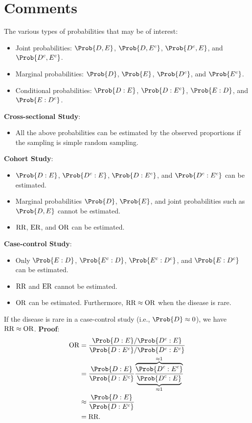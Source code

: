 \section{Comments}
The various types of probabilities that may be of interest:
\begin{itemize}
    \item Joint probabilities: $ \Prob{D,E} $, $ \Prob{D,E^c} $, $ \Prob{D^c,E} $, and $ \Prob{D^c,E^c} $.
    \item Marginal probabilities: $ \Prob{D} $, $ \Prob{E} $, $ \Prob{D^c} $, and $ \Prob{E^c} $.
    \item Conditional probabilities: $ \Prob{D\given E} $, $ \Prob{D\given E^c} $, $ \Prob{E\given D} $, and $ \Prob{E\given D^c} $.
\end{itemize}
\textbf{Cross-sectional Study}:
\begin{itemize}
    \item All the above probabilities can be estimated by the observed
          proportions if the sampling is simple random sampling.
\end{itemize}
\textbf{Cohort Study}:
\begin{itemize}
    \item $ \Prob{D\given E} $, $ \Prob{D^c\given E} $, $ \Prob{D\given E^c} $, and $ \Prob{D^c\given E^c} $
          can be estimated.
    \item Marginal probabilities $ \Prob{D} $, $ \Prob{E} $, and joint probabilities
          such as $ \Prob{D,E} $ cannot be estimated.
    \item $ \text{RR} $, $ \text{ER} $, and $ \text{OR} $ can be estimated.
\end{itemize}
\textbf{Case-control Study}:
\begin{itemize}
    \item Only $ \Prob{E\given D} $, $ \Prob{E^c\given D} $, $ \Prob{E^c\given D^c} $, and $ \Prob{E\given D^c} $ can be estimated.
    \item $ \text{RR} $ and $ \text{ER} $ cannot be estimated.
    \item $ \text{OR} $ can be estimated. Furthermore, $ \text{RR}\approx \text{OR} $ when the disease is rare.
\end{itemize}
\begin{Result}{}
    If the disease is rare in a case-control study (i.e., $ \Prob{D}\approx 0 $), we have $ \text{RR}\approx \text{OR} $.
    \tcblower{}
    \textbf{Proof}:
    \begin{align*}
        \OR
         & =\frac{\Prob{D\given E}/\Prob{D^c\given E}}{\Prob{D\given E^c}/\Prob{D^c\given E^c}}                                                         \\
         & =\frac{\Prob{D\given E}}{\Prob{D\given E^c}}\frac{\overbrace{\Prob{D^c\given E^c}}^{\approx 1}}{\underbrace{\Prob{D^c\given E}}_{\approx 1}} \\
         & \approx \frac{\Prob{D\given E}}{\Prob{D\given E^c}}                                                                                          \\
         & =\RR.
    \end{align*}
\end{Result}
